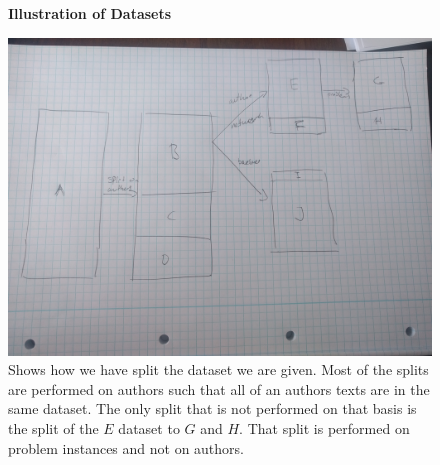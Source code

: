 \begin{figure}
    \centering
    \textbf{Illustration of Datasets}\par\medskip
    \includegraphics[width=\textwidth]{./pictures/data/data_split.jpg}
    \caption{Shows how we have split the dataset we are given. Most of the
        splits are performed on authors such that all of an authors texts are
        in the same dataset. The only split that is not performed on that basis
        is the split of the $E$ dataset to $G$ and $H$. That split is performed
        on problem instances and not on authors.}
    \label{fig:data_split}
\end{figure}
